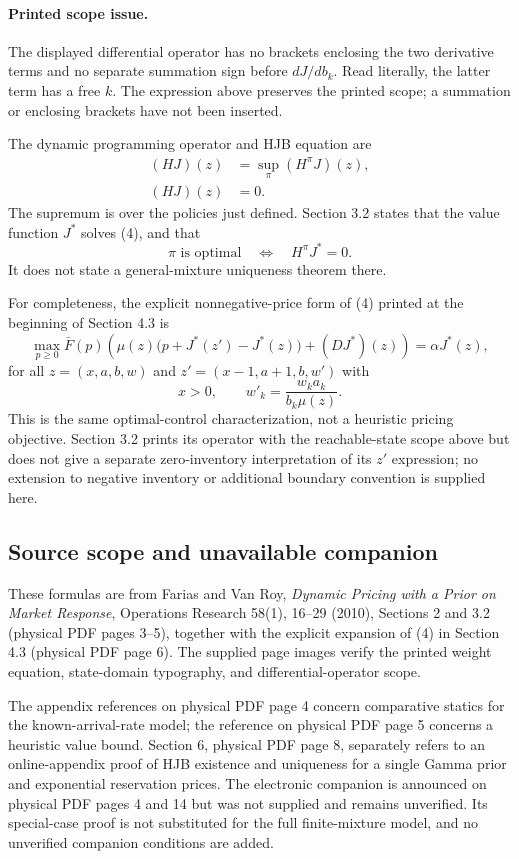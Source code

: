 \documentclass{article}
\begin{document}
\paragraph{Printed scope issue.}
The displayed differential operator has no brackets enclosing the two derivative terms and no separate summation sign before \(dJ/db_k\). Read literally, the latter term has a free \(k\). The expression above preserves the printed scope; a summation or enclosing brackets have not been inserted.

The dynamic programming operator and HJB equation are
\begin{align}
(HJ)(z)&=\sup_\pi(H^\pi J)(z),\tag{3}\\
(HJ)(z)&=0.\tag{4}
\end{align}
The supremum is over the policies just defined. Section 3.2 states that the value function \(J^*\) solves (4), and that
\[
\pi\text{ is optimal}\quad\Longleftrightarrow\quad H^\pi J^*=0.
\]
It does not state a general-mixture uniqueness theorem there.

For completeness, the explicit nonnegative-price form of (4) printed at the beginning of Section 4.3 is
\[
\max_{p\geq0}\bar F(p)\left(
\mu(z)\bigl(p+J^*(z')-J^*(z)\bigr)+(DJ^*)(z)
\right)=\alpha J^*(z),
\]
for all \(z=(x,a,b,w)\) and \(z'=(x-1,a+1,b,w')\) with
\[
x>0,\qquad w'_k=\frac{w_ka_k}{b_k\mu(z)}.
\]
This is the same optimal-control characterization, not a heuristic pricing objective. Section 3.2 prints its operator with the reachable-state scope above but does not give a separate zero-inventory interpretation of its \(z'\) expression; no extension to negative inventory or additional boundary convention is supplied here.

\subsection*{Source scope and unavailable companion}
These formulas are from Farias and Van Roy, \emph{Dynamic Pricing with a Prior on Market Response}, Operations Research 58(1), 16--29 (2010), Sections 2 and 3.2 (physical PDF pages 3--5), together with the explicit expansion of (4) in Section 4.3 (physical PDF page 6). The supplied page images verify the printed weight equation, state-domain typography, and differential-operator scope.

The appendix references on physical PDF page 4 concern comparative statics for the known-arrival-rate model; the reference on physical PDF page 5 concerns a heuristic value bound. Section 6, physical PDF page 8, separately refers to an online-appendix proof of HJB existence and uniqueness for a single Gamma prior and exponential reservation prices. The electronic companion is announced on physical PDF pages 4 and 14 but was not supplied and remains unverified. Its special-case proof is not substituted for the full finite-mixture model, and no unverified companion conditions are added.
\end{document}
